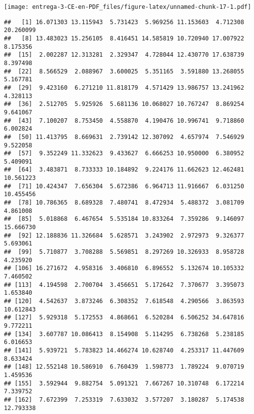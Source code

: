 \documentclass[
]{article}
\newenvironment{Shaded}{\begin{snugshade}}{\end{snugshade}}
\newcommand{\DataTypeTok}[1]{\textcolor[rgb]{0.13,0.29,0.53}{#1}}
\newcommand{\DecValTok}[1]{\textcolor[rgb]{0.00,0.00,0.81}{#1}}
\newcommand{\KeywordTok}[1]{\textcolor[rgb]{0.13,0.29,0.53}{\textbf{#1}}}
\newcommand{\NormalTok}[1]{#1}
\newcommand{\OperatorTok}[1]{\textcolor[rgb]{0.81,0.36,0.00}{\textbf{#1}}}
\newcommand{\StringTok}[1]{\textcolor[rgb]{0.31,0.60,0.02}{#1}}
\begin{document}
\texttt{[image: entrega-3-CE-en-PDF\_files/figure-latex/unnamed-chunk-17-1.pdf]}

\begin{Shaded}
\end{Shaded}

\begin{verbatim}
##   [1] 16.071303 13.115943  5.731423  5.969256 11.153603  4.712308 20.260099
##   [8] 13.483023 15.256105  8.416451 14.585819 10.720940 17.007922  8.175356
##  [15]  2.002287 12.313281  2.329347  4.728044 12.430770 17.638739  8.397498
##  [22]  8.566529  2.088967  3.600025  5.351165  3.591880 13.268055  5.167781
##  [29]  9.423160  6.271210 11.818179  4.571429 13.986757 13.241962  4.328113
##  [36]  2.512705  5.925926  5.681136 10.068027 10.767247  8.869254  9.641067
##  [43]  7.100207  8.753450  4.558870  4.190476 10.996741  9.718860  6.002824
##  [50] 11.413795  8.669631  2.739142 12.307092  4.657974  7.546929  9.522058
##  [57]  9.352249 11.332623  9.433627  6.666253 10.950000  6.380952  5.409091
##  [64]  3.483871  8.733333 10.184892  9.224176 11.662623 12.462481 10.561223
##  [71] 10.424347  7.656304  5.672386  6.964713 11.916667  6.031250 10.455456
##  [78] 10.786365  8.689328  7.480741  8.472934  5.488372  3.081709  4.861008
##  [85]  5.018868  6.467654  5.535184 10.833264  7.359286  9.146097 15.666730
##  [92] 12.188836 11.326684  5.628571  3.243902  2.972973  9.326377  5.693061
##  [99]  5.710877  3.708288  5.569851  8.297269 10.326933  8.958728  4.235920
## [106] 16.271672  4.958316  3.406810  6.896552  5.132674 10.105332  7.460502
## [113]  4.194598  2.700704  3.456651  5.172642  7.370677  3.395073  1.653840
## [120]  4.542637  3.873246  6.308352  7.618548  4.290566  3.863593 10.612843
## [127]  5.929318  5.172553  4.868661  6.520284  6.506252 34.647816  9.772211
## [134]  3.607787 10.086413  8.154908  5.114295  6.738268  5.238185  6.016653
## [141]  5.939721  5.783823 14.466274 10.628740  4.253317 11.447609  8.633424
## [148] 12.552148 10.586910  6.760439  1.598773  1.789224  9.070719  1.459536
## [155]  3.592944  9.882754  5.091321  7.667267 10.310748  6.172214  7.339752
## [162]  7.672399  7.253319  7.633032  3.577207  3.180287  5.174538 12.793338

\end{verbatim}
\end{document}
